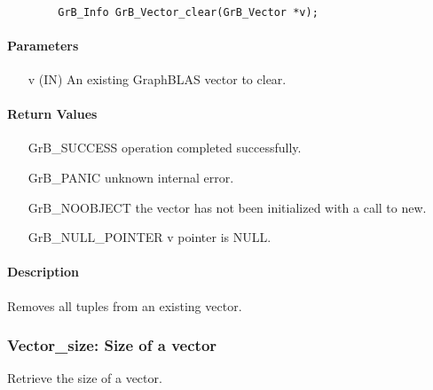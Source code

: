 \paragraph{\syntax}

\begin{verbatim}
        GrB_Info GrB_Vector_clear(GrB_Vector *v);
\end{verbatim}

\paragraph{Parameters}

\begin{itemize}[leftmargin=1.1in]
    \item[{\sf v}] ({\sf IN}) An existing GraphBLAS vector to clear.
\end{itemize}

\paragraph{Return Values}

\begin{itemize}[leftmargin=2.1in]
\item[{\sf GrB\_SUCCESS}]   operation completed successfully.
\item[{\sf GrB\_PANIC}]     unknown internal error.
\item[{\sf GrB\_NOOBJECT}]  the vector has not been initialized with a call to new.
\item[{\sf GrB\_NULL\_POINTER}]    {\sf v} pointer is {\sf NULL}.
\end{itemize}

\paragraph{Description}

Removes all tuples from an existing vector.

\subsubsection{{\sf Vector\_size}: Size of a vector}

Retrieve the size of a vector.

\paragraph{\syntax}

